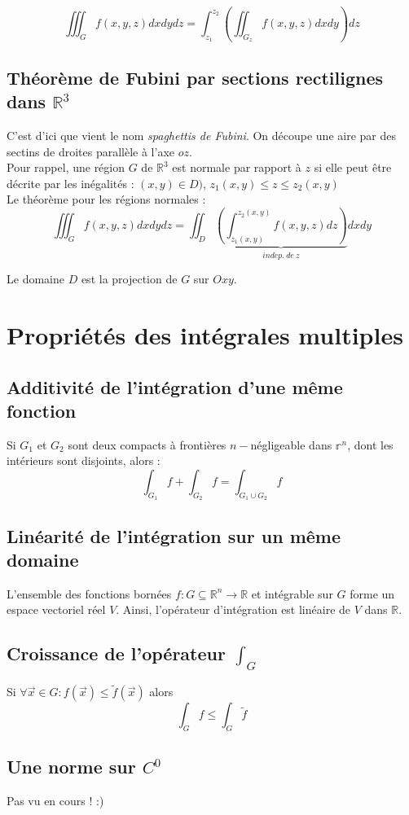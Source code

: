 \documentclass	[11pt, a4paper, openany]{book}
\begin{document}
$$\iiint_G f(x,y,z)dx dy dz = \int_{z_1}^{z_2} \left( \iint_{G_z} f(x, y, z) dx dy \right) dz$$


\subsection{Théorème de Fubini par sections rectilignes dans $\mathbb{R}^3$}
C'est d'ici que vient le nom \textit{spaghettis de Fubini}. On découpe une aire par des sectins de droites parallèle à l'axe $oz$.\\
Pour rappel, une région $G$ de $\mathbb{R}^3$ est normale par rapport à $z$ si elle peut être décrite par les inégalités : $(x,y) \in D)$, $z_1(x,y) \leq z \leq z_2(x,y)$\\

Le théorème pour les régions normales :
$$\iiint_G f(x,y,z) dx dy dz = \iint_D \underbrace{\left(\int_{z_1(x,y)}^{z_2(x,y)}f(x,y, z) dz\right)}_{indep.\ de\ z} dxdy$$

Le domaine $D$ est la projection de $G$ sur $Oxy$.


\section{Propriétés des intégrales multiples}
\subsection{Additivité de l'intégration d'une même fonction}
Si $G_1$ et $G_2$ sont deux compacts à frontières $n-$négligeable dans $\mathbb{r}^n$, dont les intérieurs sont disjoints, alors : 
$$\int_{G_1} f + \int_{G_2} f = \int_{G_1 \cup G_2} f$$

\subsection{Linéarité de l'intégration sur un même domaine}
L'ensemble des fonctions bornées $f : G \subseteq \mathbb{R}^n \rightarrow \mathbb{R}$ et intégrable sur $G$ forme un espace vectoriel réel $V$. Ainsi, l'opérateur d'intégration est linéaire de $V$ dans $\mathbb{R}$.

\subsection{Croissance de l'opérateur $\int_G$}
Si $\forall \vec{x} \in G : f(\vec{x}) \leq \tilde{f}(\vec{x})$ alors
$$\int_G f \leq \int_G \tilde{f}$$

\subsection{Une norme sur $C^0$}
Pas vu en cours ! :)
\end{document}
